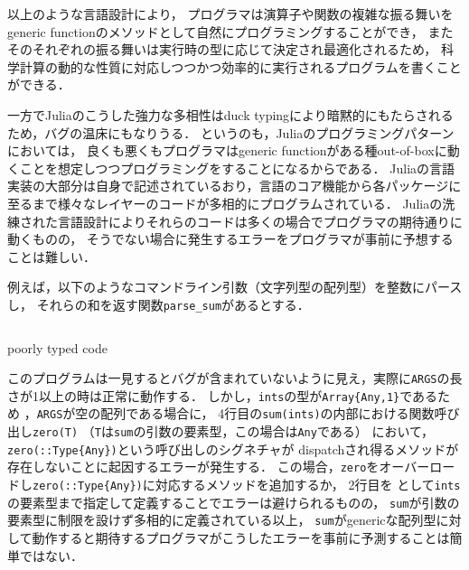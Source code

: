 以上のような言語設計により，
プログラマは演算子や関数の複雑な振る舞いをgeneric functionのメソッドとして自然にプログラミングすることができ\footnotemark，
またそのそれぞれの振る舞いは実行時の型に応じて決定され最適化されるため，
科学計算の動的な性質に対応しつつかつ効率的に実行されるプログラムを書くことができる．


\vspace{1ex}

一方でJuliaのこうした強力な多相性はduck typingにより暗黙的にもたらされるため，バグの温床にもなりうる．
というのも，Juliaのプログラミングパターンにおいては，
良くも悪くもプログラマはgeneric functionがある種out-of-boxに動くことを想定しつつプログラミングをすることになるからである．
Juliaの言語実装の大部分は自身で記述されているおり，言語のコア機能から各パッケージに至るまで様々なレイヤーのコードが多相的にプログラムされている．
Juliaの洗練された言語設計によりそれらのコードは多くの場合でプログラマの期待通りに動くものの，
そうでない場合に発生するエラーをプログラマが事前に予想することは難しい．

例えば，以下のようなコマンドライン引数（文字列型の配列型）を整数にパースし，
それらの和を返す関数\verb|parse_sum|があるとする．

\begin{listing}[ht]
  \inputminted[frame=lines]{julia}{src/parse_sum.jl}
  \caption{poorly typed code}
  \label{lst:target1}
\end{listing}

このプログラムは一見するとバグが含まれていないように見え，実際に\verb|ARGS|の長さが1以上の時は正常に動作する．
しかし，\verb|ints|の型が\verb|Array{Any,1}|であるため
\footnotemark %
，\verb|ARGS|が空の配列である場合に，
4行目の\verb|sum(ints)|の内部における関数呼び出し\verb|zero(T)|
（\verb|T|は\verb|sum|の引数の要素型，この場合は\verb|Any|である）
において， \verb|zero(::Type{Any})|という呼び出しのシグネチャが
dispatchされ得るメソッドが存在しないことに起因するエラーが発生する．
この場合，\verb|zero|をオーバーロードし\verb|zero(::Type{Any})|に対応するメソッドを追加するか，
2行目を  として\verb|ints|の要素型まで指定して定義することでエラーは避けられるものの，
\verb|sum|が引数の要素型に制限を設けず多相的に定義されている以上，
\verb|sum|がgenericな配列型に対して動作すると期待するプログラマがこうしたエラーを事前に予測することは簡単ではない．

